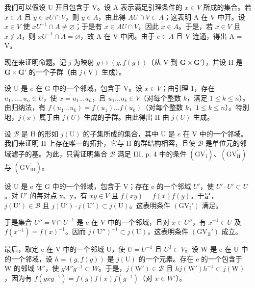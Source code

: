 我们可以假设 U 开且包含于 V。设 A 表示满足引理条件的 \(x \in V\) 所成的集合。若 \(x \in A\) 且 \(y \in xU \cap V\)，则 \(y \in A\)，由此得 \(AU \cap V \subset A\)；这表明 A 在 V 中开。设 \(x \in V\) 使 \(xU^{-1} \cap A \neq \varnothing\)；于是有 \(x \in AU \cap V\)，因此 \(x \in A\)。于是，若 \(x \in V\) 且 \(x \notin A\)，则 \(xU^{-1} \cap A = \varnothing\)，故 A 在 V 中闭。由于 \(e \in A\) 且 V 连通，得出 A = V。

现在来证明命题。记 \(j\) 为映射 \(g \mapsto (g, f(g))\)（从 V 到 \(\mathbf{G} \times \mathbf{G}'\)），并设 H 是 \(\mathbf{G} \times \mathbf{G}'\) 的一个子群（由 \(j(\mathrm{V})\) 生成）。

设 U 是 \(e\) 在 G 中的一个邻域，包含于 V。设 \(x \in V\)；由引理 1，存在 \(u_1, \ldots, u_n \in U\)，使 \(x = u_1 \ldots u_n\)，且 \(u_1 \ldots u_k \in V\)（对每个整数 \(k\)，满足 \(1 \leqslant k \leqslant n\)）。由归纳法，有 \(f(u_1 \ldots u_k) = f(u_1) \ldots f(u_k)\)（对每个整数 \(k\)，\(1 \leqslant k \leqslant n\)）。特别地，\(j(x)\) 属于由 \(j(U)\) 生成的子群。由此得出 H 由 \(j(U)\) 生成。

设 \(\mathcal{B}\) 是 H 的形如 \(j(\mathrm{U})\) 的子集所成的集合，其中 U 是 \(e\) 在 V 中的一个邻域。我们来证明 H 上存在唯一的拓扑，它与 H 的群结构相容，且使 \(\mathcal{B}\) 是单位元的邻域滤子的基。为此，只需证明集合 \(\mathcal{B}\) 满足 III, p. 4 中的条件 \((\mathrm{GV}_{\mathrm{I}}^{\prime})\)、\((\mathrm{GV}_{\mathrm{II}}^{\prime})\) 与 \((\mathrm{GV}_{\mathrm{III}}^{\prime})\)。

设 U 是 e 在 G 中的一个邻域，包含于 V；存在 e 的一个邻域 \(U'\)，使 \(U' \cdot U' \subset U\)。对 \(U'\) 的每对点 x、y，有 \(xy \in V\) 且 \(f(xy) = f(x)f(y)\)。于是，\(j(\mathrm{U}') \in \mathcal{B}\) 且 \(j(\mathrm{U}') \cdot j(\mathrm{U}') \subset j(\mathrm{U})\)。这表明条件 \((\mathrm{GV}_{\mathrm{I}}')\) 满足。

于是集合 \(U'' = V \cap U^{-1}\) 是 e 在 V 中的一个邻域，且对 \(x \in U''\)，有 \(x^{-1} \in U\) 及 \(f(x^{-1}) = f(x)^{-1}\)。因而 \(j(\mathrm{U}'')^{-1} \subset j(\mathrm{U})\)，这表明条件 \((\mathrm{GV}_{\mathrm{II}}' )\) 成立。

最后，取定 e 在 V 中的一个邻域 U，使 \(U = U^{-1}\) 且 \(U^{3} \subset V\)。设 W 是 e 在 U 中的一个邻域，设 \(h = (g, f(g))\) 是 \(j(\mathrm{U})\) 的一个元素。存在 e 的一个包含于 W 的邻域 \(W'\)，使 \(gW'g^{-1} \subset W\)。于是，\(j(\mathrm{W}') \in \mathcal{B}\) 且 \(hj(\mathrm{W}')h^{-1} \subset j(\mathrm{W})\)，因为有 \(f(gxg^{-1}) = f(g)f(x)f(g^{-1})\)（对 \(x \in W'\)）。

